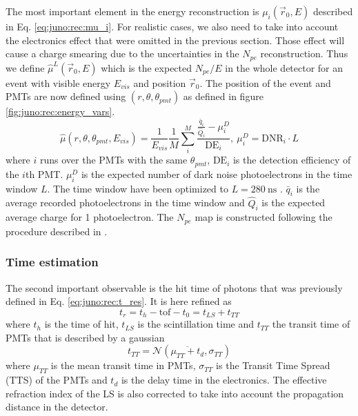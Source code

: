 \documentclass[../main.tex]{subfiles}
\begin{document}
The most important element in the energy reconstruction is $\mu_i(\vec{r}_0, E)$ described in Eq. \ref{eq:juno:rec:mu_i}. For realistic cases, we also need to take into account the electronics effect that were omitted in the previous section. Those effect will cause a charge smearing due to the uncertainties in the $N_{pe}$ reconstruction. Thus we define $\hat{\mu}^L(\vec{r}_0, E)$ which is the expected $N_{pe}/E$ in the whole detector for an event with visible energy $E_{vis}$ and position $\vec{r}_0$. The position of the event and PMTs are now defined using $(r, \theta, \theta_{pmt})$ as defined in figure \ref{fig:juno:rec:energy_vars}.
\begin{equation}
  \hat{\mu}(r, \theta, \theta_{pmt}, E_{vis}) = \frac{1}{E_{vis}} \frac{1}{M} \sum_i^M\frac{\frac{\bar{q}_i}{\hat{Q}_i} - \mu_i^D}{\mathrm{DE}_i}, ~ \mu_i^D = \mathrm{DNR}_i \cdot L
\end{equation}
where $i$ runs over the PMTs with the same $\theta_{pmt}$, $\mathrm{DE}_i$ is the detection efficiency of the $i$th PMT. $\mu_i^D$ is the expected number of dark noise photoelectrons in the time window $L$. The time window have been optimized to $L = 280 ~ \mathrm{ns}$ \cite{huang_data-driven_2023}. $\bar{q}_i$ is the average recorded photoelectrons in the time window and $\hat{Q}_i$ is the expected average charge for 1 photoelectron. The $N_{pe}$ map is constructed following the procedure described in \cite{huang_improving_2021}.

\subsubsection{Time estimation}

The second important observable is the hit time of photons that was previously defined in Eq. \ref{eq:juno:rec:t_res}. It is here refined as
\begin{equation}
  t_r = t_h - \mathrm{tof} - t_0 = t_{LS} + t_{TT}
\end{equation}
where $t_h$ is the time of hit, $t_{LS}$ is the scintillation time and $t_{TT}$ the transit time of PMTs that is described by a gaussian
\begin{equation}
  t_{TT} = \mathcal{N}(\overline{\mu_{TT} + t_{d}}, \sigma_{TT})
\end{equation}
where $\mu_{TT}$ is the mean transit time in PMTs, $\sigma_{TT}$ is the Transit Time Spread (TTS) of the PMTs and $t_{d}$ is the delay time in the electronics. The effective refraction index of the LS is also corrected to take into account the propagation distance in the detector.
\end{document}
